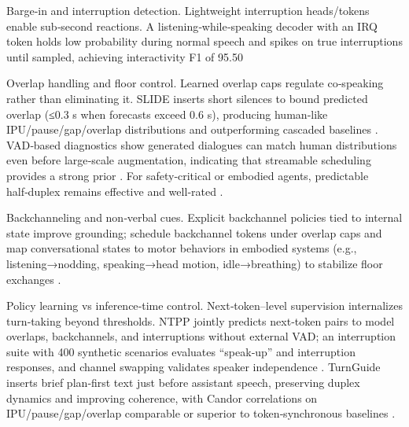 Barge‑in and interruption detection. Lightweight interruption heads/tokens enable sub‑second reactions. A listening‑while‑speaking decoder with an IRQ token holds low probability during normal speech and spikes on true interruptions until sampled, achieving interactivity F1 of 95.50%

Overlap handling and floor control. Learned overlap caps regulate co‑speaking rather than eliminating it. SLIDE inserts short silences to bound predicted overlap (≤0.3 s when forecasts exceed 0.6 s), producing human‑like IPU/pause/gap/overlap distributions and outperforming cascaded baselines \cite{lu2025slideintegratingspeechlanguagemodelllmsp}. VAD‑based diagnostics show generated dialogues can match human distributions even before large‑scale augmentation, indicating that streamable scheduling provides a strong prior \cite{fu2024investigatingeffectslargescalepseudoster}. For safety‑critical or embodied agents, predictable half‑duplex remains effective and well‑rated \cite{fu2025personalizedsociallyassistiverobotsendsp}.

Backchanneling and non‑verbal cues. Explicit backchannel policies tied to internal state improve grounding; schedule backchannel tokens under overlap caps and map conversational states to motor behaviors in embodied systems (e.g., listening→nodding, speaking→head motion, idle→breathing) to stabilize floor exchanges \cite{lu2025slideintegratingspeechlanguagemodelllmsp,fu2025personalizedsociallyassistiverobotsendsp}.

Policy learning vs inference‑time control. Next‑token–level supervision internalizes turn‑taking beyond thresholds. NTPP jointly predicts next‑token pairs to model overlaps, backchannels, and interruptions without external VAD; an interruption suite with 400 synthetic scenarios evaluates “speak‑up” and interruption responses, and channel swapping validates speaker independence \cite{wang2025ntppgenerativespeechlanguagemodelingdual}. TurnGuide inserts brief plan‑first text just before assistant speech, preserving duplex dynamics and improving coherence, with Candor correlations on IPU/pause/gap/overlap comparable or superior to token‑synchronous baselines \cite{cui2025thinkbeforeyoutalkenhancingmeaningfuldia}.

